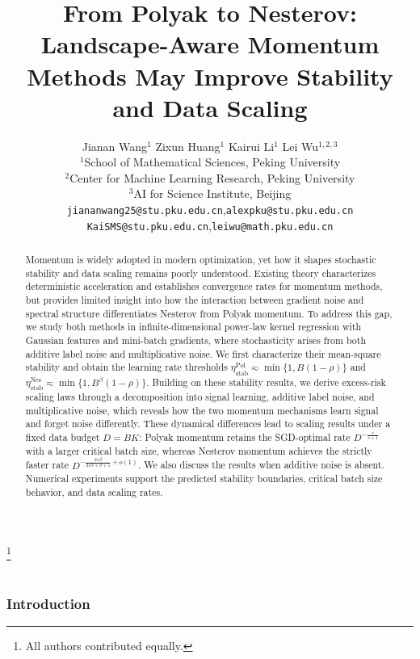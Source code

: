 \documentclass[11pt]{article}
\title{From Polyak to Nesterov: Landscape-Aware Momentum Methods May Improve Stability and Data Scaling}
\author{
    Jianan Wang$^{1}$\quad
    Zixun Huang$^{1}$\quad
    Kairui Li$^{1}$\quad
    Lei Wu$^{1,2,3}$
      \\
  $^1$School of Mathematical Sciences, Peking University 
    \\
  $^2$Center for Machine Learning Research, Peking University
  \\
  $^3$AI for Science Institute, Beijing\\[.5em]
  \texttt{jiananwang25@stu.pku.edu.cn},\quad  \texttt{alexpku@stu.pku.edu.cn}\\ 
  \texttt{KaiSMS@stu.pku.edu.cn},\quad  \texttt{leiwu@math.pku.edu.cn}\\ 
}
\date{\vspace*{-2em}}
\newcommand{\blfootnote}[1]{%
  \begingroup
  \renewcommand\thefootnote{}%
  \footnote{#1}%
  \addtocounter{footnote}{-1}%
  \endgroup
}
\begin{document}
\maketitle
\blfootnote{All authors contributed equally.}



\begin{abstract}
Momentum is widely adopted in modern optimization, yet how it shapes stochastic stability and data scaling remains poorly understood. 
Existing theory characterizes deterministic acceleration and establishes
convergence rates for momentum methods, but provides limited
insight into how the interaction between gradient noise and spectral
structure differentiates Nesterov from Polyak momentum.
To address this gap, we study both methods in infinite-dimensional power-law kernel regression with Gaussian features and mini-batch gradients, where stochasticity arises from both additive label noise and multiplicative noise. We first characterize their mean-square stability and obtain the learning rate thresholds \(\eta_{\mathrm{stab}}^{\mathrm{Pol}}\eqsim\min\{1,B(1-\rho)\}\) and \(\eta_{\mathrm{stab}}^{\mathrm{Nes}}\eqsim\min\{1,B^\beta(1-\rho)\}\). Building on these stability results, we derive excess-risk scaling laws through a decomposition into signal learning, additive label noise, and multiplicative noise, which reveals how the two momentum mechanisms learn signal and forget noise differently. These dynamical differences lead to scaling results under a fixed data budget \(D=BK\): Polyak momentum retains the SGD-optimal rate \(D^{-\frac {s}{s+1}}\) with a larger critical batch size, whereas Nesterov momentum achieves the strictly faster rate \(D^{-\frac{2s\beta}{2s\beta+\beta+1}+o(1)}\). We also discuss the results when additive noise is absent. Numerical experiments support the predicted stability boundaries, critical batch size behavior, and data scaling rates.
\end{abstract}

\doparttoc
\faketableofcontents
\part{}

\vspace*{-1.5em}
\section{Introduction}
\end{document}
